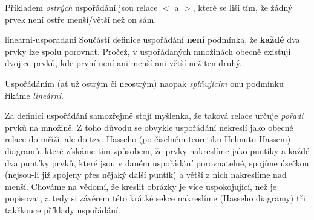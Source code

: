 Příkladem \emph{ostrých} uspořádání jsou relace $<$ a $>$, které se liší tím, že
žádný prvek není ostře menší/větší než on sám.

\begin{warning}{}{linearni-usporadani}
 Součástí definice uspořádání \textbf{není} podmínka, že \textbf{každé} dva
 prvky lze spolu porovnat. Pročež, v uspořádaných množinách obecně existují
 dvojice prvků, kde první není ani menší ani větší než ten druhý.

 Uspořádáním (ať už ostrým či neostrým) naopak \emph{splňujícím} onu podmínku
 říkáme \emph{lineární}.
\end{warning}

Za definicí uspořádání samozřejmě stojí myšlenka, že taková relace určuje
\emph{pořadí} prvků na množině. Z toho důvodu se obvykle uspořádání nekreslí
jako obecné relace do mříží, ale do tzv. Hasseho (po číselném teoretiku Helmutu
Hassem) diagramů, které získáme tím způsobem, že prvky nakreslíme jako puntíky a
každé dva puntíky prvků, které jsou v daném uspořádání porovnatelné, spojíme
úsečkou (nejsou-li již spojeny přes nějaký další puntík) a větší z nich
nakreslíme nad menší. Chováme na vědomí, že kreslit obrázky je více
uspokojující, než je popisovat, a tedy si závěrem této krátké sekce nakreslíme
(Hasseho diagramy) tři takřkouce  příklady uspořádání.

